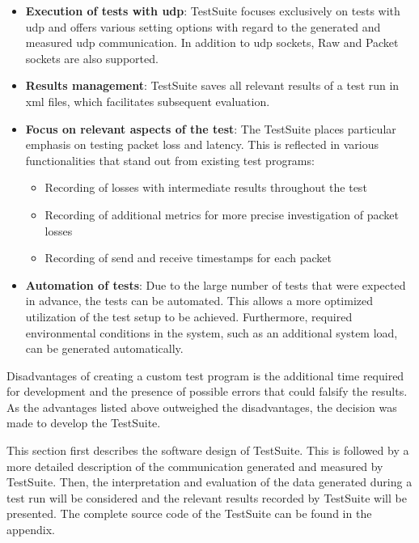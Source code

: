 \begin{itemize}
\item \textbf{Execution of tests with \ac{udp}}: TestSuite focuses exclusively on tests with \ac{udp} and offers various setting options with regard to the generated and measured \ac{udp} communication. In addition to \ac{udp} sockets, Raw and Packet sockets are also supported.
\item \textbf{Results management}: TestSuite saves all relevant results of a test run in \ac{xml} files, which facilitates subsequent evaluation.
\item \textbf{Focus on relevant aspects of the test}: The TestSuite places particular emphasis on testing packet loss and latency. This is reflected in various functionalities that stand out from existing test programs:

	\begin{itemize}
      \item Recording of losses with intermediate results throughout the test
      \item Recording of additional metrics for more precise investigation of packet losses
      \item Recording of send and receive timestamps for each packet
    \end{itemize}

\item \textbf{Automation of tests}: Due to the large number of tests that were expected in advance, the tests can be automated. This allows a more optimized utilization of the test setup to be achieved. Furthermore, required environmental conditions in the system, such as an additional system load, can be generated automatically.
\end{itemize}

Disadvantages of creating a custom test program is the additional time required for development and the presence of possible errors that could falsify the results. As the advantages listed above outweighed the disadvantages, the decision was made to develop the TestSuite.

This section first describes the software design of TestSuite. This is followed by a more detailed description of the communication generated and measured by TestSuite. Then, the interpretation and evaluation of the data generated during a test run will be considered and the relevant results recorded by TestSuite will be presented. The complete source code of the TestSuite can be found in the appendix.


